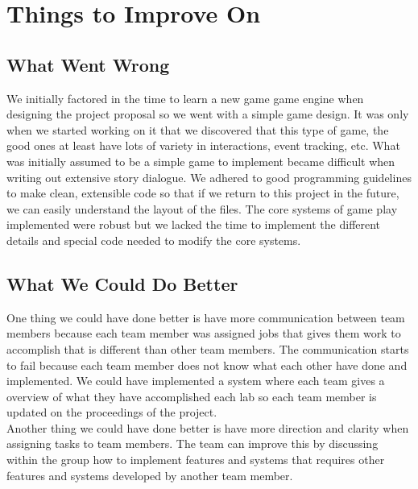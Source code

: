 \documentclass[a4paper]{article}
\begin{document}
\section{Things to Improve On}
\subsection{What Went Wrong}
We initially factored in the time to learn a new game game engine when designing the project proposal so we went with a simple game design. It was only when we started working on it that we discovered that this type of game, the good ones at least have lots of variety in interactions, event tracking, etc. What was initially assumed to be a simple game to implement became difficult when writing out extensive story dialogue. We adhered to good programming guidelines to make clean, extensible code so that if we return to this project in the future, we can easily understand the layout of the files. The core systems of game play implemented were robust but we lacked the time to implement the different details and special code needed to modify the core systems. 
\subsection{What We Could Do Better} 
One thing we could have done better is have more communication between team members because each team member was assigned jobs that gives them work to accomplish that is different than other team members. The communication starts to fail because each team member does not know what each other have done and implemented. We could have implemented a system where each team gives a overview of what they have accomplished each lab so each team member is updated on the proceedings of the project.\\
Another thing we could have done better is have more direction and clarity when assigning tasks to team members. The team can improve this by discussing within the group how to implement features and systems that requires other features and systems developed by another team member. 
\end{document}

